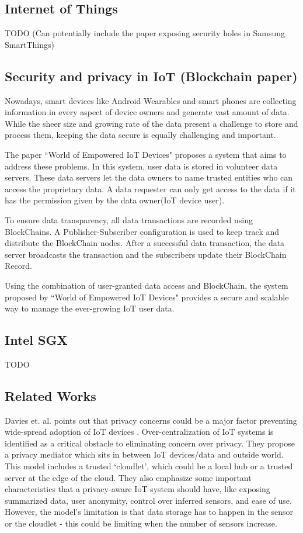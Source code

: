 \subsection{Internet of Things}
TODO
(Can potentially include the paper exposing security holes in Samsung SmartThings)

\subsection{Security and privacy in IoT (Blockchain paper)}
Nowadays, smart devices like Android Wearables and smart phones are collecting information in every aspect of device owners and generate vast amount of data. While the sheer size and growing rate of the data present a challenge to store and process them, keeping the data secure is equally challenging and important.

The paper ``World of Empowered IoT Devices" \cite{campbell} proposes a system that aims to address these problems. In this system, user data is stored in volunteer data servers. These data servers let the data owners to name trusted entities who can access the proprietary data. A data requester can only get access to the data if it has the permission given by the data owner(IoT device user). 

To ensure data transparency, all data transactions are recorded using BlockChains. A Publisher-Subscriber configuration is used to keep track and distribute the BlockChain nodes. After a successful data transaction, the data server broadcasts the transaction and the subscribers update their BlockChain Record.

Using the combination of user-granted data access and BlockChain, the system proposed by ``World of Empowered IoT Devices" provides a secure and scalable way to manage the ever-growing IoT user data.

\subsection{Intel SGX}
TODO

\subsection{Related Works}
Davies et. al. points out that privacy concerns could be a major factor preventing wide-spread adoption of IoT devices \cite{davies}. Over-centralization of IoT systems is identified as a critical obstacle to eliminating concern over privacy. They propose a privacy mediator which sits in between IoT devices/data and outside world. This model includes a trusted `cloudlet', which could be a local hub or a trusted server at the edge of the cloud. They also emphasize some important characteristics that a privacy-aware IoT system should have, like exposing summarized data, user anonymity, control over inferred sensors, and ease of use. However, the model's limitation is that data storage has to happen in the sensor or the cloudlet - this could be limiting when the number of sensors increase.

